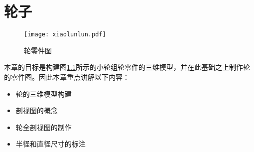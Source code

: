 \chapter{轮子}
\begin{figure}[htbp]
\centering
\texttt{[image: xiaolunlun.pdf]}
\caption{轮零件图}\label{fig:xiaolunlun.pdf}
\end{figure}

本章的目标是构建图\ref{fig:xiaolunlun.pdf}所示的小轮组轮零件的三维模型，并在此基础之上制作轮的零件图。因此本章重点讲解以下内容：
\begin{itemize}
\item 轮的三维模型构建
\item 剖视图的概念
\item 轮全剖视图的制作
\item 半径和直径尺寸的标注
\end{itemize}




%
\endinput